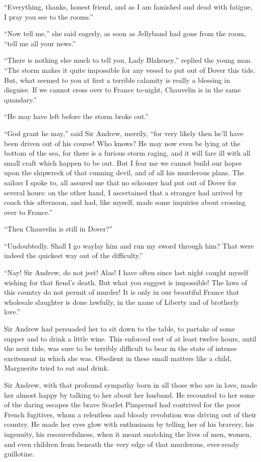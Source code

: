 \documentclass[paper=a5,BCOR=7mm,twoside,DIV=calc,12pt,usegeometry,chapterprefix,endperiod,headings=big]{scrbook}
\begin{document}
\enquote{Everything, thanks, honest friend, and as I am famished and dead with fatigue, I pray you see to the rooms.}

\enquote{Now tell me,} she said eagerly, as soon as Jellyband had gone from the room, \enquote{tell me all your news.}

\enquote{There is nothing else much to tell you, Lady Blakeney,} replied the young man. \enquote{The storm makes it quite impossible for any vessel to put out of Dover this tide. But, what seemed to you at first a terrible calamity is really a blessing in disguise. If we cannot cross over to France to-night, Chauvelin is in the same quandary.}

\enquote{He may have left before the storm broke out.}

\enquote{God grant he may,} said Sir Andrew, merrily, \enquote{for very likely then he'll have been driven out of his course! Who knows? He may now even be lying at the bottom of the sea, for there is a furious storm raging, and it will fare ill with all small craft which happen to be out. But I fear me we cannot build our hopes upon the shipwreck of that cunning devil, and of all his murderous plans. The sailors I spoke to, all assured me that no schooner had put out of Dover for several hours: on the other hand, I ascertained that a stranger had arrived by coach this afternoon, and had, like myself, made some inquiries about crossing over to France.}

\enquote{Then Chauvelin is still in Dover?}

\enquote{Undoubtedly. Shall I go waylay him and run my sword through him? That were indeed the quickest way out of the difficulty.}

\enquote{Nay! Sir Andrew, do not jest! Alas! I have often since last night caught myself wishing for that fiend's death. But what you suggest is impossible! The laws of this country do not permit of murder! It is only in our beautiful France that wholesale slaughter is done lawfully, in the name of Liberty and of brotherly love.}

Sir Andrew had persuaded her to sit down to the table, to partake of some supper and to drink a little wine. This enforced rest of at least twelve hours, until the next tide, was sure to be terribly difficult to bear in the state of intense excitement in which she was. Obedient in these small matters like a child, Marguerite tried to eat and drink.

Sir Andrew, with that profound sympathy born in all those who are in love, made her almost happy by talking to her about her husband. He recounted to her some of the daring escapes the brave Scarlet Pimpernel had contrived for the poor French fugitives, whom a relentless and bloody revolution was driving out of their country. He made her eyes glow with enthusiasm by telling her of his bravery, his ingenuity, his resourcefulness, when it meant snatching the lives of men, women, and even children from beneath the very edge of that murderous, ever-ready guillotine.
\end{document}
